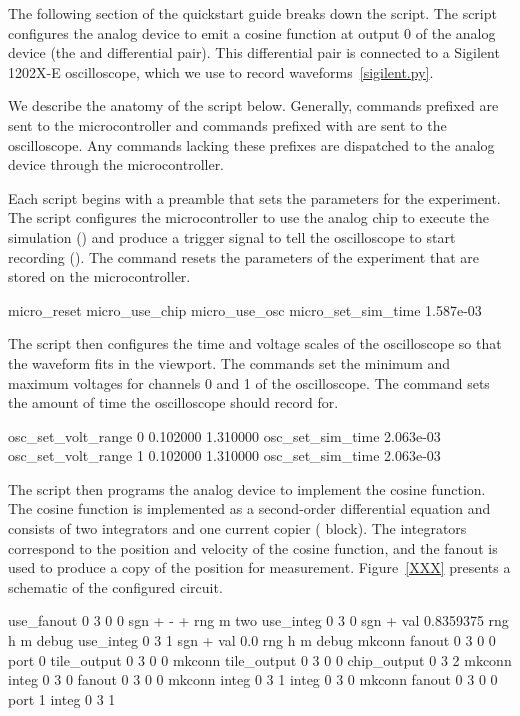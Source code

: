 The following section of the quickstart guide breaks down the 
 script. The 
script configures the analog device to emit a
cosine function at output 0 of the analog device (the  and 
differential pair). This differential pair is connected to a Sigilent 1202X-E
oscilloscope, which we use to record waveforms~\ref{sigilent.py}.

We describe the anatomy of the \grendel script below. Generally, commands
prefixed  are sent to the microcontroller and commands prefixed with
 are sent to the oscilloscope. Any commands lacking these prefixes are
dispatched to the analog device through the microcontroller.


Each \grendel script begins with a preamble that sets the parameters for the
experiment. The  script configures the microcontroller to use the
analog chip to execute the simulation () and produce a
trigger signal to tell the oscilloscope to start recording (). The 
command resets the parameters of the experiment that are stored on the
microcontroller.

\begin{snippet}
micro_reset
micro_use_chip
micro_use_osc
micro_set_sim_time 1.587e-03
\end{snippet}

The \grendel script then configures the time and voltage scales of the
oscilloscope so that the waveform fits in the viewport. The 
commands set the minimum and maximum voltages for channels 0 and 1 of the
oscilloscope. The  command sets the amount of time the
oscilloscope should record for.

\begin{snippet}
osc_set_volt_range 0 0.102000 1.310000
osc_set_sim_time 2.063e-03
osc_set_volt_range 1 0.102000 1.310000
osc_set_sim_time 2.063e-03
\end{snippet}

The \grendel script then programs the analog device to implement the cosine
function. The cosine function is implemented as a second-order differential
equation and consists of two integrators and one current copier (
block). The integrators correspond to the position and velocity of the cosine
function, and the fanout is used to produce a copy of the position for
measurement. Figure~\ref{XXX} presents a schematic of the configured circuit.

\begin{snippet}
use_fanout 0 3 0 0  sgn + - + rng m two
use_integ 0 3 0 sgn + val 0.8359375 rng h m debug
use_integ 0 3 1 sgn + val 0.0 rng h m debug
mkconn fanout 0 3 0 0 port 0 tile_output 0 3 0 0
mkconn tile_output 0 3 0 0 chip_output 0 3 2
mkconn integ 0 3 0 fanout 0 3 0 0
mkconn integ 0 3 1 integ 0 3 0
mkconn fanout 0 3 0 0 port 1 integ 0 3 1
\end{snippet}

